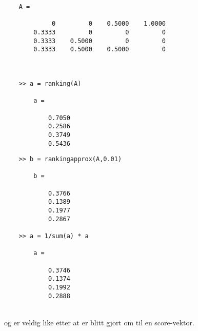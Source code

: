 \documentclass{article}%
\begin{document}
\hspace*{0mm}\begin{minipage}[t]{.46\linewidth}  
\begin{tcolorbox}[box align=top, colframe=white]
    \scriptsize
    \begin{verbatim}
    A =

             0         0    0.5000    1.0000
        0.3333         0         0         0
        0.3333    0.5000         0         0
        0.3333    0.5000    0.5000         0



    >> a = ranking(A)

        a =

            0.7050
            0.2586
            0.3749
            0.5436

    \end{verbatim}
\end{tcolorbox}
\end{minipage}
\hspace*{0mm}\begin{minipage}[t]{.46\linewidth}  
    \begin{tcolorbox}[box align=top, colframe=white]
        \scriptsize
        \begin{verbatim}
    >> b = rankingapprox(A,0.01)

        b =

            0.3766
            0.1389
            0.1977
            0.2867

    >> a = 1/sum(a) * a

        a =

            0.3746
            0.1374
            0.1992
            0.2888

\end{verbatim}
\end{tcolorbox}
\end{minipage}\\
 og  er veldig like etter at 
er blitt gjort om til en score-vektor.
%
%
%
\end{document}
